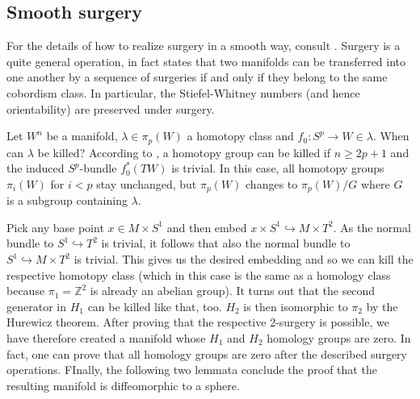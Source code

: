 
\subsection{Smooth surgery}
For the details of how to realize surgery in a smooth way, consult \cite[paragraph 1]{Milnor61}.
Surgery is a quite general operation, in fact \cite[Theorem 1]{Milnor61} states that two manifolds can be transferred 
into one another by a sequence of surgeries if and only if they belong to the same cobordism class.
In particular, the Stiefel-Whitney numbers (and hence orientability) are preserved under surgery.

Let $W^n$ be a manifold, $\lambda \in \pi_p(W)$ a homotopy class and $f_0: S^p \to W \in \lambda$. When can $\lambda$ be killed?
According to \cite[Lemma 3]{Milnor61}, a homotopy group can be killed if $n \geq 2p+1$ and the induced $S^p$-bundle $f_0^*(TW)$ is trivial.
In this case, all homotopy groups $\pi_i(W)$ for $i < p$ stay unchanged, but $\pi_p(W)$ changes to $\pi_p(W)/G$ where $G$ is a subgroup containing $\lambda$.

Pick any base point $x \in M \times S^1$ and then embed $x \times S^1 \hookrightarrow M \times T^2$.
As the normal bundle to $S^1 \hookrightarrow T^2$ is trivial, it follows that also the normal bundle to $S^1 \hookrightarrow M \times T^2$ is trivial.
This gives us the desired embedding and so we can kill the respective homotopy class 
(which in this case is the same as a homology class because $\pi_1 = \mathbb Z^2$ is already an abelian group).
It turns out that the second generator in $H_1$ can be killed like that, too.
$H_2$ is then isomorphic to $\pi_2$ by the Hurewicz theorem.
After proving that the respective 2-surgery is possible, we have therefore created a manifold whose $H_1$ and $H_2$ homology groups are zero.
In fact, one can prove that all homology groups are zero after the described surgery operations.
FInally, the following two lemmata conclude the proof that the resulting manifold is diffeomorphic to a sphere.

